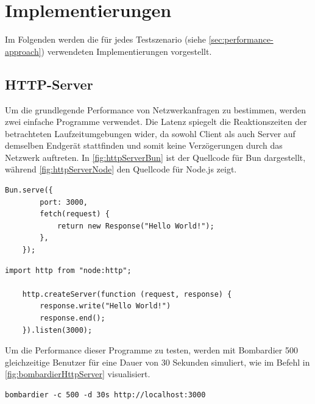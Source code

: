 \section{Implementierungen} \label{sec:performance-implementations}
Im Folgenden werden die für jedes Testszenario (siehe \autoref{sec:performance-approach}) verwendeten Implementierungen vorgestellt.

\subsection{HTTP-Server} \label{subsec:httpServer}
Um die grundlegende Performance von Netzwerkanfragen zu bestimmen, werden zwei einfache Programme verwendet. Die Latenz spiegelt die Reaktionszeiten der betrachteten Laufzeitumgebungen wider, da sowohl Client als auch Server auf demselben Endgerät stattfinden und somit keine Verzögerungen durch das Netzwerk auftreten. In \autoref{fig:httpServerBun} ist der Quellcode für Bun dargestellt, während \autoref{fig:httpServerNode} den Quellcode für Node.js zeigt.

\begin{lstlisting}[caption={[HTTP-Server Bun]HTTP-Server Bun\\\textit{Quelle: Eigene Darstellung}},label={fig:httpServerBun}]
	Bun.serve({
		port: 3000,
		fetch(request) {
			return new Response("Hello World!");
		},
	});
\end{lstlisting}

\begin{lstlisting}[caption={[HTTP-Server Node.js]HTTP-Server Node.js\\\textit{Quelle: Eigene Darstellung}},label={fig:httpServerNode}]
	import http from "node:http";
	
	http.createServer(function (request, response) {
		response.write("Hello World!")
		response.end();
	}).listen(3000);
\end{lstlisting}

\noindent
Um die Performance dieser Programme zu testen, werden mit Bombardier 500 gleichzeitige Benutzer für eine Dauer von 30 Sekunden simuliert, wie im Befehl in \autoref{fig:bombardierHttpServer} visualisiert.

\begin{lstlisting}[caption={[Bombardier HTTP-Server]Bombardier HTTP-Server\\\textit{Quelle: Eigene Darstellung}},label={fig:bombardierHttpServer}]
	bombardier -c 500 -d 30s http://localhost:3000
\end{lstlisting}

